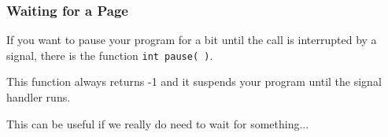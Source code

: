 \begin{frame}
	\frametitle{Waiting for a Page}

	If you want to pause your program for a bit until the call is interrupted by a signal, there is the function \texttt{int pause( )}.

	This function always returns -1 and it suspends your program until the signal handler runs.

	This can be useful if we really do need to wait for something...

\end{frame}






